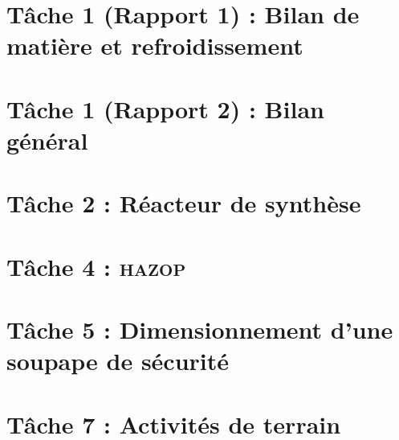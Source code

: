 \documentclass[a4paper,oneside,12pt]{report}
\begin{document}


\tableofcontents

\chapter{T\^ache 1 (Rapport 1) : Bilan de matière et refroidissement}


\chapter{T\^ache 1 (Rapport 2) : Bilan général} 


\chapter{T\^ache 2 : Réacteur de synthèse}


\chapter{T\^ache 4 : \textsc{hazop}}


\chapter{T\^ache 5 : Dimensionnement d'une soupape de sécurité}


\chapter{T\^ache 7 : Activités de terrain}


\nocite{*}
\printbibliography
\end{document}

